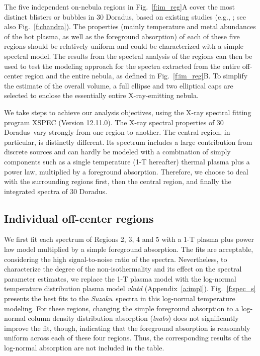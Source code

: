\documentclass[usenatbib]{mnras}
\def\xs{30 Doradus}
\def\suzaku{{\sl Suzaku}}
\begin{document}
The five independent on-nebula regions in Fig.~\ref{f:im_reg}A cover the most distinct blisters or bubbles in \xs, based on existing studies (e.g., \citealt{Wang2};  see also Fig.~\ref{f:chandra}). The properties (mainly temperature and metal abundances of the hot plasma, as well as the foreground absorption) of each of these five regions should be relatively uniform and could be characterized with a  simple spectral model. The results from the spectral analysis of the regions can then be used to test the modeling approach for the spectra extracted from the entire off-center region and the entire nebula, as defined in Fig.~\ref{f:im_reg}B. To simplify the estimate of the overall volume, a full ellipse and two elliptical caps are selected to enclose the essentially entire X-ray-emitting nebula.  

We take steps to achieve our analysis objectives, using the X-ray spectral fitting program XSPEC (Version 12.11.0). The X-ray spectral properties of \xs\ vary strongly from one region to another. The central region, in particular, is distinctly different. Its spectrum includes a large contribution from discrete sources and can hardly be modeled with a combination of simply components such as a single temperature (1-T hereafter) thermal plasma plus a power law, multiplied by a foreground absorption. Therefore, we choose to deal with the surrounding regions first, then the central region, and finally the integrated spectra of \xs. 

\subsection{Individual off-center regions}\label{ss:res-ind}

We first fit each spectrum of Regions 2, 3, 4 and 5 with a 1-T plasma plus power law model multiplied by a simple foreground absorption. The fits are acceptable, considering the high signal-to-noise ratio of the spectra. Nevertheless, to characterize the degree of the non-isothermality and its effect on the spectral parameter estimates, we replace the 1-T plasma model with the log-normal temperature distribution plasma model {\it vlntd}  (Appendix~\ref{a:impl}). Fig.~\ref{f:spec_s} presents the best fits to the \suzaku\ spectra in this log-normal temperature modeling. For these regions, changing the simple foreground absorption to a log-normal column density distribution absorption ({\it lnabs}) does not significantly improve the fit, though, indicating that the foreground absorption is reasonably uniform across each of these four regions. Thus, the corresponding results of the log-normal absorption are not included in the table. 
\end{document}
